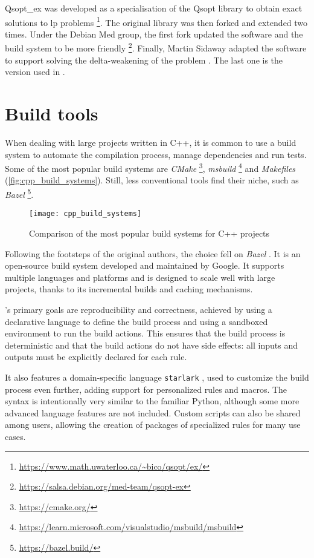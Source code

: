 Qsopt\_ex was developed as a specialisation of the Qsopt library to obtain exact solutions to \gls{lp} problems \footnote{\url{https://www.math.uwaterloo.ca/~bico/qsopt/ex/}}.
The original library was then forked and extended two times.
Under the Debian Med group, the first fork updated the software and the build system to be more friendly \footnote{\url{https://salsa.debian.org/med-team/qsopt-ex}}.
Finally, Martin Sidaway adapted the software to support solving the delta-weakening of the problem \cite{repo:qsopt-ex}.
The last one is the version used in \dlinear.

\section{Build tools}

When dealing with large projects written in C++, it is common to use a build system to automate the compilation process, manage dependencies and run tests.
Some of the most popular build systems are \textit{CMake} \footnote{\url{https://cmake.org/}}, \textit{msbuild} \footnote{\url{https://learn.microsoft.com/visualstudio/msbuild/msbuild}} and \textit{Makefiles} (\autoref{fig:cpp_build_systems}).
Still, less conventional tools find their niche, such as \textit{Bazel} \footnote{\url{https://bazel.build/}}.

\begin{figure}[h]
    \centering
    \texttt{[image: cpp\_build\_systems]}
    \caption{Comparison of the most popular build systems for C++ projects \cite{art:cpp-build-system}}\label{fig:cpp_build_systems}
\end{figure}

Following the footsteps of the original authors, the choice fell on \textit{Bazel} \cite{repo:bazel}.
It is an open-source build system developed and maintained by Google.
It supports multiple languages and platforms and is designed to scale well with large projects, thanks to its incremental builds and caching mechanisms.

\bazel's primary goals are reproducibility and correctness, achieved by using a declarative language to define the build process and using a sandboxed environment to run the build actions.
This ensures that the build process is deterministic and that the build actions do not have side effects: all inputs and outputs must be explicitly declared for each rule.

It also features a domain-specific language \texttt{starlark} \cite{repo:starlark}, used to customize the build process even further, adding support for personalized rules and macros.
The syntax is intentionally very similar to the familiar Python, although some more advanced language features are not included.
Custom scripts can also be shared among users, allowing the creation of packages of specialized rules for many use cases.

